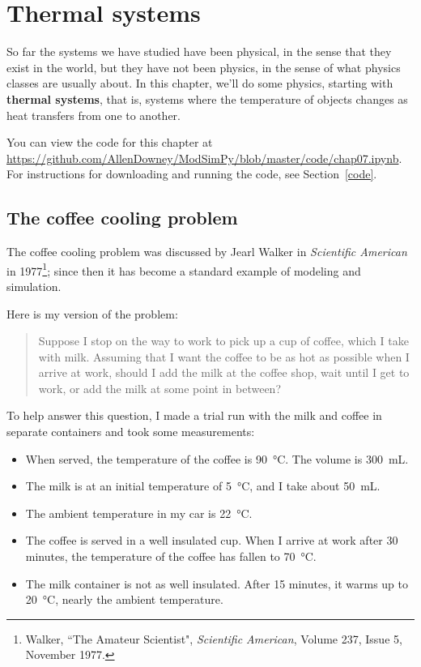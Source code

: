\documentclass[12pt]{book}
\theoremstyle{exercise}
\begin{document}
\chapter{Thermal systems}

So far the systems we have studied have been physical, in the sense that they exist in the world, but they have not been physics, in the sense of what physics classes are usually about.  In this chapter, we'll do some physics, starting with {\bf thermal systems}, that is, systems where the temperature of objects changes as heat transfers from one to another.

You can view the code for this chapter at \url{https://github.com/AllenDowney/ModSimPy/blob/master/code/chap07.ipynb}.  For instructions for downloading and running the code, see Section~\ref{code}.

\section{The coffee cooling problem}

The coffee cooling problem was discussed by Jearl Walker in {\it Scientific American} in 1977\footnote{Walker, ``The Amateur Scientist", {\it Scientific American}, Volume 237, Issue 5, November 1977.}; since then it has become a standard example of modeling and simulation.

Here is my version of the problem:

\begin{quote}
Suppose I stop on the way to work to pick up a cup of coffee, which I take with milk.  Assuming that I want the coffee to be as hot as possible when I arrive at work, should I add the milk at the coffee shop, wait until I get to work, or add the milk at some point in between?
\end{quote}

To help answer this question, I made a trial run with the milk and coffee in separate containers and took some measurements:

\begin{itemize}

\item When served, the temperature of the coffee is \SI{90}{\celsius}.  The volume is \SI{300}{mL}.

\item The milk is at an initial temperature of \SI{5}{\celsius}, and I take about \SI{50}{mL}.

\item The ambient temperature in my car is \SI{22}{\celsius}.

\item The coffee is served in a well insulated cup.  When I arrive at work after 30 minutes, the temperature of the coffee has fallen to \SI{70}{\celsius}.

\item The milk container is not as well insulated.  After 15 minutes, it warms up to \SI{20}{\celsius}, nearly the ambient temperature.

\end{itemize}
\end{document}
